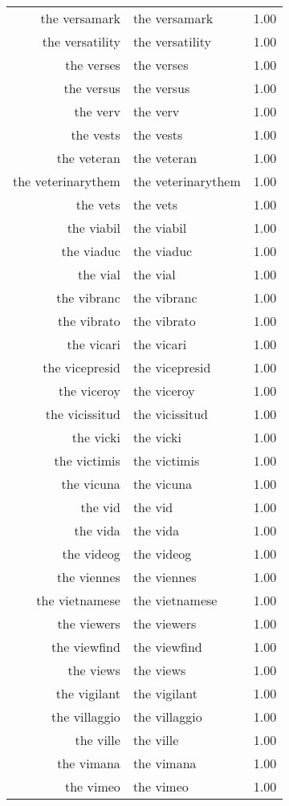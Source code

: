 \begin{table}[ht]
\begin{tabular}{rlr}
  the versamark & the versamark & 1.00 \\ 
  the versatility & the versatility & 1.00 \\ 
  the verses & the verses & 1.00 \\ 
  the versus & the versus & 1.00 \\ 
  the verv & the verv & 1.00 \\ 
  the vests & the vests & 1.00 \\ 
  the veteran & the veteran & 1.00 \\ 
  the veterinarythem & the veterinarythem & 1.00 \\ 
  the vets & the vets & 1.00 \\ 
  the viabil & the viabil & 1.00 \\ 
  the viaduc & the viaduc & 1.00 \\ 
  the vial & the vial & 1.00 \\ 
  the vibranc & the vibranc & 1.00 \\ 
  the vibrato & the vibrato & 1.00 \\ 
  the vicari & the vicari & 1.00 \\ 
  the vicepresid & the vicepresid & 1.00 \\ 
  the viceroy & the viceroy & 1.00 \\ 
  the vicissitud & the vicissitud & 1.00 \\ 
  the vicki & the vicki & 1.00 \\ 
  the victimis & the victimis & 1.00 \\ 
  the vicuna & the vicuna & 1.00 \\ 
  the vid & the vid & 1.00 \\ 
  the vida & the vida & 1.00 \\ 
  the videog & the videog & 1.00 \\ 
  the viennes & the viennes & 1.00 \\ 
  the vietnamese & the vietnamese & 1.00 \\ 
  the viewers & the viewers & 1.00 \\ 
  the viewfind & the viewfind & 1.00 \\ 
  the views & the views & 1.00 \\ 
  the vigilant & the vigilant & 1.00 \\ 
  the villaggio & the villaggio & 1.00 \\ 
  the ville & the ville & 1.00 \\ 
  the vimana & the vimana & 1.00 \\ 
  the vimeo & the vimeo & 1.00 \\ 

\end{tabular}
\end{table}
